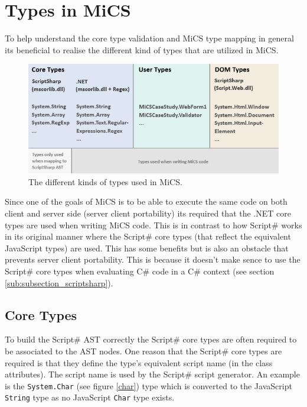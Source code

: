 \section{Types in MiCS} %
\label{sec:types_in_mics}
	To help understand the core type validation and MiCS type mapping in general its beneficial to realise the different kind of types that are utilized in MiCS.

	\begin{figure}[H]
		\begin{center}
			\centerline{\includegraphics[width=16cm]{resources/images/TypesOverview.png}}
		\end{center}
		\caption{The different kinds of types used in MiCS.}
		\label{typesOverview}
	\end{figure}

	Since one of the goals of MiCS is to be able to execute the same code on both client and server side (server client portability) its required that the .NET core types are used when writing MiCS code. This is in contrast to how Script\# works in its original manner where the Script\# core types (that reflect the equivalent JavaScript types) are used. This has some benefits but is also an obstacle that prevents server client portability. This is because it doesn't make sence to use the Script\# core types when evaluating C\# code in a C\# context (see section \ref{sub:subsection_scriptsharp}).

	\subsection{Core Types} %
	\label{sub:core_types}
		To build the Script\# AST correctly the Script\# core types are often required to be associated to the AST nodes. One reason that the Script\# core types are required is that they define the type's equivalent script name (in the class attributes). The script name is used by the Script\# script generator. An example is the \texttt{System.Char} (see figure \ref{char}) type which is converted to the JavaScript \texttt{String} type as no JavaScript \texttt{Char} type exists.

